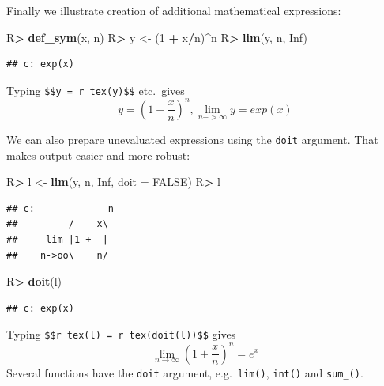 \documentclass[10pt,]{article}
\newenvironment{Shaded}{\begin{snugshade}}{\end{snugshade}}
\newcommand{\DataTypeTok}[1]{\textcolor[rgb]{0.13,0.29,0.53}{#1}}
\newcommand{\DecValTok}[1]{\textcolor[rgb]{0.00,0.00,0.81}{#1}}
\newcommand{\KeywordTok}[1]{\textcolor[rgb]{0.13,0.29,0.53}{\textbf{#1}}}
\newcommand{\NormalTok}[1]{#1}
\newcommand{\OperatorTok}[1]{\textcolor[rgb]{0.81,0.36,0.00}{\textbf{#1}}}
\newcommand{\OtherTok}[1]{\textcolor[rgb]{0.56,0.35,0.01}{#1}}
\newcommand{\StringTok}[1]{\textcolor[rgb]{0.31,0.60,0.02}{#1}}
\begin{document}
Finally we illustrate creation of additional mathematical expressions:

\begin{Shaded}
\begin{Highlighting}[]
\NormalTok{R}\OperatorTok{>}\StringTok{ }\KeywordTok{def_sym}\NormalTok{(x, n)}
\NormalTok{R}\OperatorTok{>}\StringTok{ }\NormalTok{y <-}\StringTok{ }\NormalTok{(}\DecValTok{1} \OperatorTok{+}\StringTok{ }\NormalTok{x}\OperatorTok{/}\NormalTok{n)}\OperatorTok{^}\NormalTok{n}
\NormalTok{R}\OperatorTok{>}\StringTok{ }\KeywordTok{lim}\NormalTok{(y, n, }\OtherTok{Inf}\NormalTok{)}
\end{Highlighting}
\end{Shaded}

\begin{verbatim}
## c: exp(x)
\end{verbatim}

Typing
\texttt{\$\$y\ =\ \textasciigrave{}r\ tex(y)\textasciigrave{}\$\$}
etc.~gives \[
y = \left(1 + \frac{x}{n}\right)^{n}, \lim_{n->\infty} y = exp(x)
\]

We can also prepare unevaluated expressions using the \texttt{doit}
argument. That makes output easier and more robust:

\begin{Shaded}
\begin{Highlighting}[]
\NormalTok{R}\OperatorTok{>}\StringTok{ }\NormalTok{l <-}\StringTok{ }\KeywordTok{lim}\NormalTok{(y, n, }\OtherTok{Inf}\NormalTok{, }\DataTypeTok{doit =} \OtherTok{FALSE}\NormalTok{)}
\NormalTok{R}\OperatorTok{>}\StringTok{ }\NormalTok{l}
\end{Highlighting}
\end{Shaded}

\begin{verbatim}
## c:             n
##         /    x\ 
##     lim |1 + -| 
##    n->oo\    n/
\end{verbatim}

\begin{Shaded}
\begin{Highlighting}[]
\NormalTok{R}\OperatorTok{>}\StringTok{ }\KeywordTok{doit}\NormalTok{(l)}
\end{Highlighting}
\end{Shaded}

\begin{verbatim}
## c: exp(x)
\end{verbatim}

Typing
\texttt{\$\$\textasciigrave{}r\ tex(l)\textasciigrave{}\ =\ \textasciigrave{}r\ tex(doit(l))\textasciigrave{}\$\$}
gives \[
\lim_{n \to \infty} \left(1 + \frac{x}{n}\right)^{n} = e^{x}
\] Several functions have the \texttt{doit} argument,
e.g.~\texttt{lim()}, \texttt{int()} and \texttt{sum\_()}.
\end{document}
